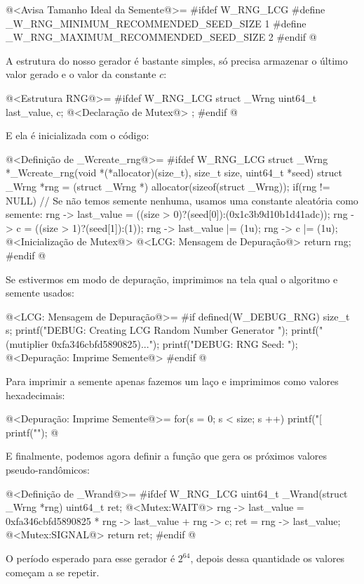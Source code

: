\iniciocodigo
@<Avisa Tamanho Ideal da Semente@>=
#ifdef W_RNG_LCG
#define _W_RNG_MINIMUM_RECOMMENDED_SEED_SIZE  1
#define _W_RNG_MAXIMUM_RECOMMENDED_SEED_SIZE  2
#endif
@
\fimcodigo

A estrutura do nosso gerador é bastante simples, só precisa armazenar
o último valor gerado e o valor da constante $c$:

\iniciocodigo
@<Estrutura RNG@>=
#ifdef W_RNG_LCG
struct _Wrng{
  uint64_t last_value, c;
  @<Declaração de Mutex@>
};
#endif
@
\fimcodigo

E ela é inicializada com o código:

\iniciocodigo
@<Definição de \_Wcreate\_rng@>=
#ifdef W_RNG_LCG
struct _Wrng *_Wcreate_rng(void *(*allocator)(size_t), size_t size,
                           uint64_t *seed){
  struct _Wrng *rng = (struct _Wrng *) allocator(sizeof(struct _Wrng));
  if(rng != NULL){
    // Se não temos semente nenhuma, usamos uma constante aleatória como semente:
    rng -> last_value = ((size > 0)?(seed[0]):(0x1c3b9d10b1d41adc));
    rng -> c = ((size > 1)?(seed[1]):(1));
    rng -> last_value |= (1u);
    rng -> c |= (1u);
    @<Inicialização de Mutex@>
    @<LCG: Mensagem de Depuração@>
  }
  return rng;
}
#endif
@
\fimcodigo

Se estivermos em modo de depuração, imprimimos na tela qual o
algoritmo e semente usados:

\iniciocodigo
@<LCG: Mensagem de Depuração@>=
#if defined(W_DEBUG_RNG)
{
  size_t s;
  printf("DEBUG: Creating LCG Random Number Generator ");
  printf("(mutiplier 0xfa346cbfd5890825)...\n");
  printf("DEBUG: RNG Seed: ");
  @<Depuração: Imprime Semente@>
}
#endif
@
\fimcodigo

Para imprimir a semente apenas fazemos um laço e imprimimos como
valores hexadecimais:

\iniciocodigo
@<Depuração: Imprime Semente@>=
for(s = 0; s < size; s ++){
  printf("[%
}
printf("\n");
@
\fimcodigo

E finalmente, podemos agora definir a função que gera os próximos
valores pseudo-randômicos:

\iniciocodigo
@<Definição de \_Wrand@>=
#ifdef W_RNG_LCG
uint64_t _Wrand(struct _Wrng *rng){
  uint64_t ret;
  @<Mutex:WAIT@>
  rng -> last_value = 0xfa346cbfd5890825 * rng -> last_value + rng -> c;
  ret = rng -> last_value;
  @<Mutex:SIGNAL@>
  return ret;
}
#endif
@
\fimcodigo

O período esperado para esse gerador é $2^{64}$, depois dessa
quantidade os valores começam a se repetir.


